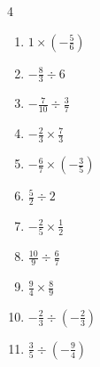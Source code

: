 \begin{multicols}{4}
\begin{enumerate}
        \phantom{$\displaystyle =1$}

  \item $\displaystyle 1\times{}\left(-\frac{5}{6}\right)$


  \item $\displaystyle -\frac{8}{3}\div{}6$


  \item $\displaystyle -\frac{7}{10}\div{}\frac{3}{7}$


  \item $\displaystyle -\frac{2}{3}\times{}\frac{7}{3}$


  \item $\displaystyle -\frac{6}{7}\times{}\left(-\frac{3}{5}\right)$


  \item $\displaystyle \frac{5}{2}\div{}2$


  \item $\displaystyle -\frac{2}{5}\times{}\frac{1}{2}$


\columnbreak %

  \item $\displaystyle \frac{10}{9}\div{}\frac{6}{7}$


  \item $\displaystyle \frac{9}{4}\times{}\frac{8}{9}$

        \phantom{$\displaystyle =2$}

  \item $\displaystyle -\frac{2}{3}\div{}\left(-\frac{2}{3}\right)$

        \phantom{$\displaystyle =1$}

  \item $\displaystyle \frac{3}{5}\div{}\left(-\frac{9}{4}\right)$



\end{enumerate}
\end{multicols}
